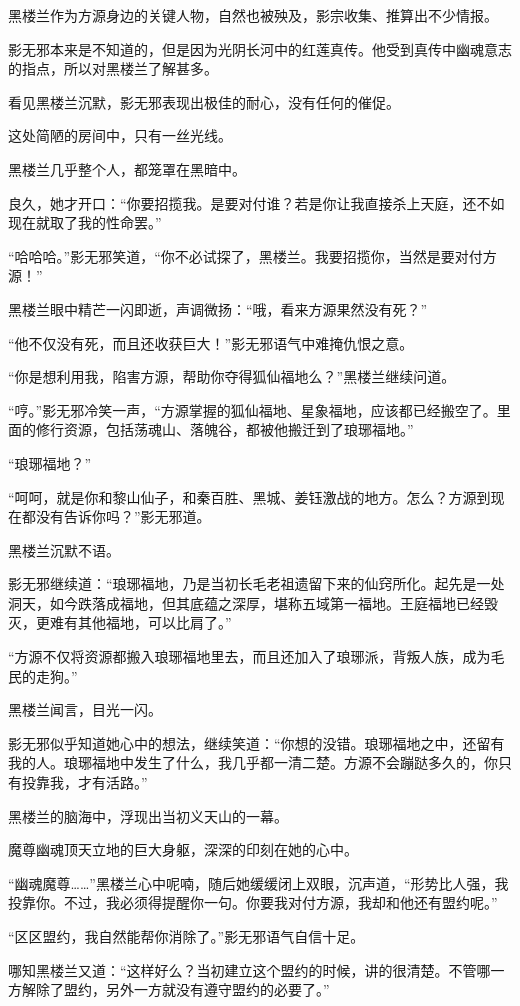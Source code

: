 \begin{this_body}
黑楼兰作为方源身边的关键人物，自然也被殃及，影宗收集、推算出不少情报。

影无邪本来是不知道的，但是因为光阴长河中的红莲真传。他受到真传中幽魂意志的指点，所以对黑楼兰了解甚多。

看见黑楼兰沉默，影无邪表现出极佳的耐心，没有任何的催促。

这处简陋的房间中，只有一丝光线。

黑楼兰几乎整个人，都笼罩在黑暗中。

良久，她才开口：“你要招揽我。是要对付谁？若是你让我直接杀上天庭，还不如现在就取了我的性命罢。”

“哈哈哈。”影无邪笑道，“你不必试探了，黑楼兰。我要招揽你，当然是要对付方源！”

黑楼兰眼中精芒一闪即逝，声调微扬：“哦，看来方源果然没有死？”

“他不仅没有死，而且还收获巨大！”影无邪语气中难掩仇恨之意。

“你是想利用我，陷害方源，帮助你夺得狐仙福地么？”黑楼兰继续问道。

“哼。”影无邪冷笑一声，“方源掌握的狐仙福地、星象福地，应该都已经搬空了。里面的修行资源，包括荡魂山、落魄谷，都被他搬迁到了琅琊福地。”

“琅琊福地？”

“呵呵，就是你和黎山仙子，和秦百胜、黑城、姜钰激战的地方。怎么？方源到现在都没有告诉你吗？”影无邪道。

黑楼兰沉默不语。

影无邪继续道：“琅琊福地，乃是当初长毛老祖遗留下来的仙窍所化。起先是一处洞天，如今跌落成福地，但其底蕴之深厚，堪称五域第一福地。王庭福地已经毁灭，更难有其他福地，可以比肩了。”

“方源不仅将资源都搬入琅琊福地里去，而且还加入了琅琊派，背叛人族，成为毛民的走狗。”

黑楼兰闻言，目光一闪。

影无邪似乎知道她心中的想法，继续笑道：“你想的没错。琅琊福地之中，还留有我的人。琅琊福地中发生了什么，我几乎都一清二楚。方源不会蹦跶多久的，你只有投靠我，才有活路。”

黑楼兰的脑海中，浮现出当初义天山的一幕。

魔尊幽魂顶天立地的巨大身躯，深深的印刻在她的心中。

“幽魂魔尊……”黑楼兰心中呢喃，随后她缓缓闭上双眼，沉声道，“形势比人强，我投靠你。不过，我必须得提醒你一句。你要我对付方源，我却和他还有盟约呢。”

“区区盟约，我自然能帮你消除了。”影无邪语气自信十足。

哪知黑楼兰又道：“这样好么？当初建立这个盟约的时候，讲的很清楚。不管哪一方解除了盟约，另外一方就没有遵守盟约的必要了。”


\end{this_body}
